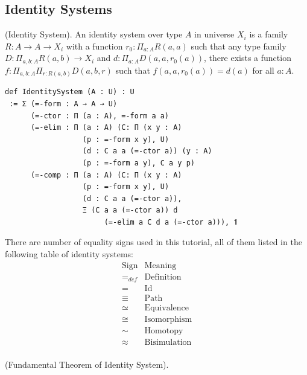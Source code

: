 \documentclass{article}
\begin{document}
\subsection{Identity Systems}
\begin{definition} (Identity System).
An identity system over type $A$ in universe $X_i$ is a
family $R : A \rightarrow A \rightarrow X_i$ with a function
$r_0: \Pi_{a:A}R(a,a)$ such that any type family
$D : \Pi_{a,b:A}R(a,b) \rightarrow X_i$ and
$d: \Pi_{a:A}D(a,a,r_0(a))$, there exists a function
$f: \Pi_{a,b:A}\Pi_{r:R(a,b)}D(a,b,r)$ such that
$f(a,a,r_0(a))=d(a)$ for all $a:A$.
\begin{lstlisting}
def IdentitySystem (A : U) : U
 := Σ (=-form : A → A → U)
      (=-ctor : Π (a : A), =-form a a)
      (=-elim : Π (a : A) (C: Π (x y : A)
                  (p : =-form x y), U)
                  (d : C a a (=-ctor a)) (y : A)
                  (p : =-form a y), C a y p)
      (=-comp : Π (a : A) (C: Π (x y : A)
                  (p : =-form x y), U)
                  (d : C a a (=-ctor a)),
                  Ξ (C a a (=-ctor a)) d
                       (=-elim a C d a (=-ctor a))), 𝟏
\end{lstlisting}
\end{definition}

\begin{example}
There are number of equality signs used in this tutorial,
all of them listed in the following table of identity systems:
$$
\begin{array}{ll} \mathrm{Sign} & \mathrm{Meaning} \\
                         \hline
                        =_{def} & \mathrm{Definition} \\
                              = & \mathrm{Id} \\
                         \equiv & \mathrm{Path} \\
                         \simeq & \mathrm{Equivalence} \\
                          \cong & \mathrm{Isomorphism} \\
                           \sim & \mathrm{Homotopy} \\
                        \approx & \mathrm{Bisimulation} \\
                      \end{array}
$$
\end{example}

\begin{theorem} (Fundamental Theorem of Identity System).
\end{theorem}
\end{document}
